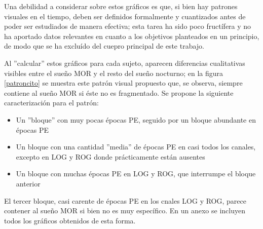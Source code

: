 Una debilidad 
a considerar sobre estos gr\'aficos
es que, si bien hay patrones 
visuales en el tiempo,
deben ser definidos formalmente y cuantizados antes de poder ser
estudiados de manera efectiva; esta tarea ha sido poco fruct\'ifera 
y no ha aportado datos relevantes en cuanto a los objetivos planteados en un principio,
de modo que se ha exclu\'ido del cuepro principal de este trabajo.
%

Al ''calcular'' estos gr\'aficos para cada sujeto,
aparecen diferencias cualitativas visibles
entre el sue\~no MOR y el resto del sue\~no nocturno; en la figura
\ref{patroncito} se muestra este patr\'on visual propuesto que,
se observa, siempre contiene al sue\~no MOR si \'este no es fragmentado.
Se propone la siguiente caracterizaci\'on
para el patr\'on:
\begin{itemize}
\item Un ''bloque'' con muy pocas \'epocas PE, seguido por un bloque abundante en
\'epocas PE
\item Un bloque con una cantidad ''media'' de \'epocas PE en casi todos los canales,
excepto en LOG y ROG donde pr\'acticamente est\'an ausentes
\item Un bloque con muchas \'epocas PE en LOG y ROG, que interrumpe el bloque anterior
\end{itemize}
El tercer bloque, casi carente de \'epocas PE en los cnales LOG y ROG, parece contener
al sue\~no MOR si bien no es muy espec\'ifico. En un anexo se incluyen
todos los gr\'aficos obtenidos de esta forma.

